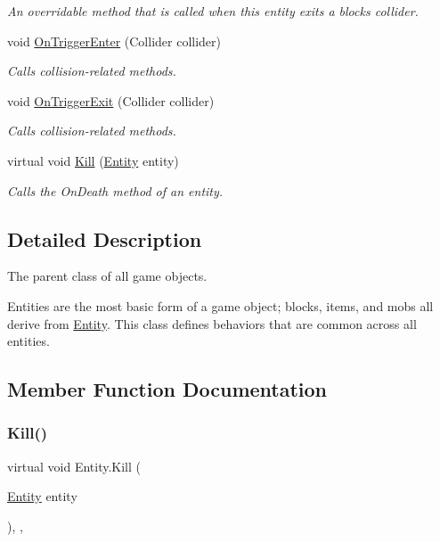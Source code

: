 \begin{DoxyCompactItemize}
\begin{DoxyCompactList}\small\item\em An overridable method that is called when this entity exits a block\textquotesingle{}s collider. \end{DoxyCompactList}\item 
void \mbox{\hyperlink{class_entity_ad869135bb5e08171e05904f728eed062}{On\+Trigger\+Enter}} (Collider collider)
\begin{DoxyCompactList}\small\item\em Calls collision-\/related methods. \end{DoxyCompactList}\item 
void \mbox{\hyperlink{class_entity_a430f39e3987d6ae36bd62ed78f02fa2c}{On\+Trigger\+Exit}} (Collider collider)
\begin{DoxyCompactList}\small\item\em Calls collision-\/related methods. \end{DoxyCompactList}\item 
virtual void \mbox{\hyperlink{class_entity_af02fade3c492c47394ebd4981de96b1d}{Kill}} (\mbox{\hyperlink{class_entity}{Entity}} entity)
\begin{DoxyCompactList}\small\item\em Calls the On\+Death method of an entity. \end{DoxyCompactList}\end{DoxyCompactItemize}


\subsection{Detailed Description}
The parent class of all game objects. 

Entities are the most basic form of a game object; blocks, items, and mobs all derive from \mbox{\hyperlink{class_entity}{Entity}}. This class defines behaviors that are common across all entities. 

\subsection{Member Function Documentation}
\mbox{\label{class_entity_af02fade3c492c47394ebd4981de96b1d}} 
\subsubsection{\texorpdfstring{Kill()}{Kill()}}
{\footnotesize\ttfamily virtual void Entity.\+Kill (\begin{DoxyParamCaption}\item[{\mbox{\hyperlink{class_entity}{Entity}}}]{entity }\end{DoxyParamCaption})\hspace{0.3cm}{\ttfamily [inline]}, {\ttfamily [protected]}, {\ttfamily [virtual]}}




